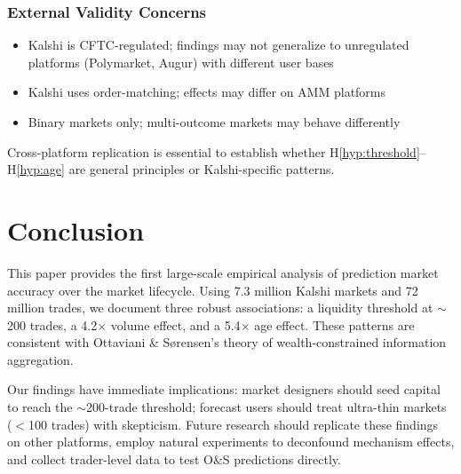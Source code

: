 \documentclass[a4paper,11pt]{article}
\theoremstyle{plain}
\theoremstyle{definition}
\theoremstyle{remark}
\begin{document}
\subsubsection{External Validity Concerns}

\begin{itemize}
    \item Kalshi is CFTC-regulated; findings may not generalize to unregulated platforms (Polymarket, Augur) with different user bases
    \item Kalshi uses order-matching; effects may differ on AMM platforms
    \item Binary markets only; multi-outcome markets may behave differently
\end{itemize}

Cross-platform replication is essential to establish whether H\ref{hyp:threshold}--H\ref{hyp:age} are general principles or Kalshi-specific patterns.

\section{Conclusion}
\label{sec:conclusion}

This paper provides the first large-scale empirical analysis of prediction market accuracy over the market lifecycle. Using 7.3 million Kalshi markets and 72 million trades, we document three robust associations: a liquidity threshold at $\sim$200 trades, a 4.2$\times$ volume effect, and a 5.4$\times$ age effect. These patterns are consistent with Ottaviani \& Sørensen's theory of wealth-constrained information aggregation.

Our findings have immediate implications: market designers should seed capital to reach the $\sim$200-trade threshold; forecast users should treat ultra-thin markets ($<$100 trades) with skepticism. Future research should replicate these findings on other platforms, employ natural experiments to deconfound mechanism effects, and collect trader-level data to test O\&S predictions directly.

\end{document}
